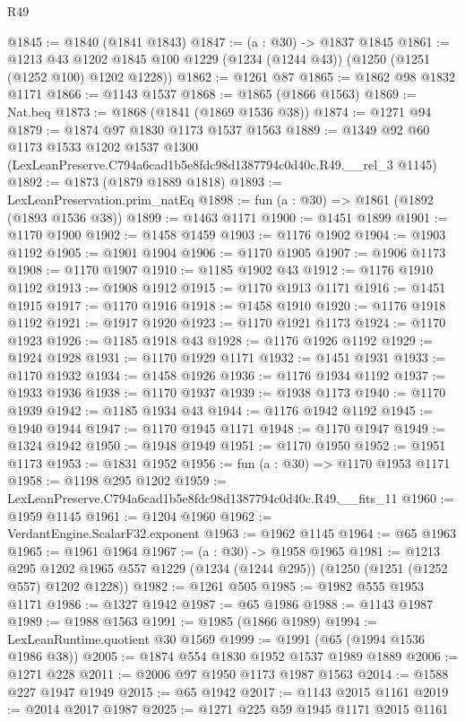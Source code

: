 \begin{lexlean}{R49}
\begin{coremodule}
@1845 := @1840 (@1841 @1843)
@1847 := (a : @30) -> @1837 @1845
@1861 := @1213
    @43
    @1202
    @1845
    @100
    @1229
    (@1234 (@1244 @43))
    (@1250 (@1251 (@1252 @100) @1202 @1228))
@1862 := @1261 @87
@1865 := @1862 @98 @1832 @1171
@1866 := @1143 @1537
@1868 := @1865 (@1866 @1563)
@1869 := Nat.beq
@1873 := @1868 (@1841 (@1869 @1536 @38))
@1874 := @1271 @94
@1879 := @1874 @97 @1830 @1173 @1537 @1563
@1889 := @1349
    @92
    @60
    @1173
    @1533
    @1202
    @1537
    @1300
    (LexLeanPreserve.C794a6cad1b5e8fdc98d1387794c0d40c.R49.__rel_3 @1145)
@1892 := @1873 (@1879 @1889 @1818)
@1893 := LexLeanPreservation.prim_natEq
@1898 := fun (a : @30) => @1861 (@1892 (@1893 @1536 @38))
@1899 := @1463 @1171
@1900 := @1451 @1899
@1901 := @1170 @1900
@1902 := @1458 @1459
@1903 := @1176 @1902
@1904 := @1903 @1192
@1905 := @1901 @1904
@1906 := @1170 @1905
@1907 := @1906 @1173
@1908 := @1170 @1907
@1910 := @1185 @1902 @43
@1912 := @1176 @1910 @1192
@1913 := @1908 @1912
@1915 := @1170 @1913 @1171
@1916 := @1451 @1915
@1917 := @1170 @1916
@1918 := @1458 @1910
@1920 := @1176 @1918 @1192
@1921 := @1917 @1920
@1923 := @1170 @1921 @1173
@1924 := @1170 @1923
@1926 := @1185 @1918 @43
@1928 := @1176 @1926 @1192
@1929 := @1924 @1928
@1931 := @1170 @1929 @1171
@1932 := @1451 @1931
@1933 := @1170 @1932
@1934 := @1458 @1926
@1936 := @1176 @1934 @1192
@1937 := @1933 @1936
@1938 := @1170 @1937
@1939 := @1938 @1173
@1940 := @1170 @1939
@1942 := @1185 @1934 @43
@1944 := @1176 @1942 @1192
@1945 := @1940 @1944
@1947 := @1170 @1945 @1171
@1948 := @1170 @1947
@1949 := @1324 @1942
@1950 := @1948 @1949
@1951 := @1170 @1950
@1952 := @1951 @1173
@1953 := @1831 @1952
@1956 := fun (a : @30) => @1170 @1953 @1171
@1958 := @1198 @295 @1202
@1959 := LexLeanPreserve.C794a6cad1b5e8fdc98d1387794c0d40c.R49.__fits_11
@1960 := @1959 @1145
@1961 := @1204 @1960
@1962 := VerdantEngine.ScalarF32.exponent
@1963 := @1962 @1145
@1964 := @65 @1963
@1965 := @1961 @1964
@1967 := (a : @30) -> @1958 @1965
@1981 := @1213
    @295
    @1202
    @1965
    @557
    @1229
    (@1234 (@1244 @295))
    (@1250 (@1251 (@1252 @557) @1202 @1228))
@1982 := @1261 @505
@1985 := @1982 @555 @1953 @1171
@1986 := @1327 @1942
@1987 := @65 @1986
@1988 := @1143 @1987
@1989 := @1988 @1563
@1991 := @1985 (@1866 @1989)
@1994 := LexLeanRuntime.quotient @30 @1569
@1999 := @1991 (@65 (@1994 @1536 @1986 @38))
@2005 := @1874 @554 @1830 @1952 @1537 @1989 @1889
@2006 := @1271 @228
@2011 := @2006 @97 @1950 @1173 @1987 @1563
@2014 := @1588 @227 @1947 @1949
@2015 := @65 @1942
@2017 := @1143 @2015 @1161
@2019 := @2014 @2017 @1987
@2025 := @1271 @225 @59 @1945 @1171 @2015 @1161

\end{coremodule}
\end{lexlean}
